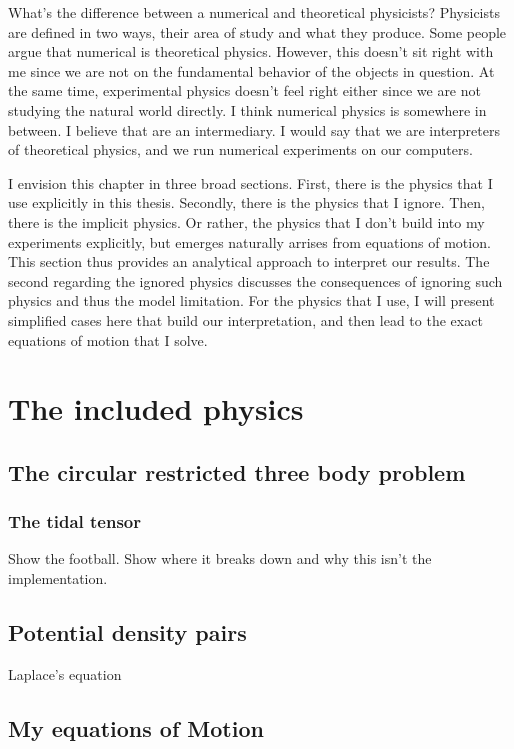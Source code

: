 What's the difference between a numerical and theoretical physicists? Physicists are defined in two ways, their area of study and what they produce. Some people argue that numerical is theoretical physics. However, this doesn't sit right with me since we are not on the fundamental behavior of the objects in question. At the same time, experimental physics doesn't feel right either since we are not studying the natural world directly. I think numerical physics is somewhere in between. I believe that are an intermediary. I would say that we are interpreters of theoretical physics, and we run numerical experiments on our computers. 

I envision this chapter in three broad sections. First,  there is the physics that I use explicitly in this thesis. Secondly, there is the physics that I ignore. Then, there is the implicit physics. Or rather, the physics that I don't build into my experiments explicitly, but emerges naturally arrises from equations of motion. This section thus provides an analytical approach to interpret our results. The second regarding the ignored physics discusses the consequences of ignoring such physics and thus the model limitation. For the physics that I use, I will present simplified cases here that build our interpretation, and then lead to the exact equations of motion that I solve. 

\section{The included physics}

    \subsection{The circular restricted three body problem}

        \subsubsection{The tidal tensor}
            Show the football. Show where it breaks down and why this isn't the implementation. 

    \subsection{Potential density pairs}
        Laplace's equation 

    \subsection{My equations of Motion} \label{subsec:myEquationsOfMotion}


